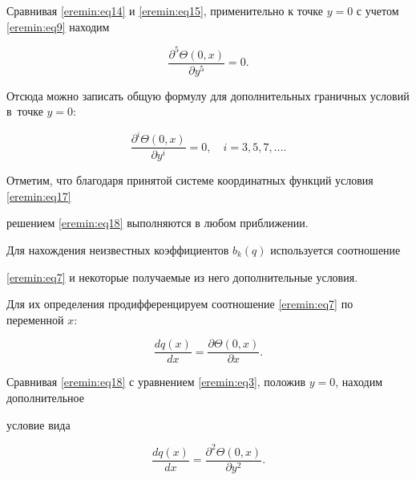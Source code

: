 Сравнивая \eqref{eremin:eq14} и \eqref{eremin:eq15}, применительно к точке $y=0$ с учетом \eqref{eremin:eq9} находим

\begin{equation}

\label{eremin:eq16}

\frac{\partial^5\Theta (0,  x)}{\partial y^5}=0.

\end{equation}



Отсюда можно записать общую формулу для дополнительных граничных условий в~точке $y=0$:

\begin{equation}

\label{eremin:eq17}

\frac{\partial^i \Theta (0,  x)}{\partial

y^i}=0, \quad i=3, 5, 7, \ldots.

\end{equation}



Отметим, что благодаря принятой системе координатных функций условия \eqref{eremin:eq17}

решением \eqref{eremin:eq18} выполняются в любом приближении.



Для нахождения неизвестных коэффициентов $b_k (q)$ используется соотношение

\eqref{eremin:eq7} и некоторые получаемые из него дополнительные условия. 

Для их определения продифференцируем соотношение \eqref{eremin:eq7} по переменной $x$:

\begin{equation}

\label{eremin:eq18}

\frac{dq(x)}{dx}=\frac{\partial \Theta (0,  x)}{\partial x}.

\end{equation}

Сравнивая \eqref{eremin:eq18} с уравнением \eqref{eremin:eq3}, положив $y=0$, находим дополнительное

условие вида

\begin{equation}

\label{eremin:eq19}

\frac{dq(x)}{dx}=\frac{\partial^2\Theta (0,  x)}{\partial y^2}.

\end{equation}

